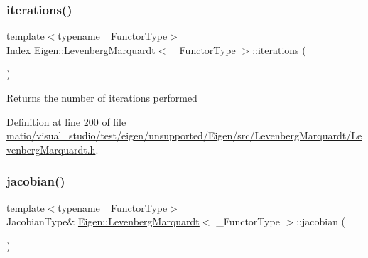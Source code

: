 \mbox{\label{class_eigen_1_1_levenberg_marquardt_aeb094683f0abe9c29ee89be0677de744}} 
\subsubsection{\texorpdfstring{iterations()}{iterations()}\hspace{0.1cm}{\footnotesize\ttfamily [2/2]}}
{\footnotesize\ttfamily template$<$typename \+\_\+\+Functor\+Type$>$ \\
Index \hyperlink{class_eigen_1_1_levenberg_marquardt}{Eigen\+::\+Levenberg\+Marquardt}$<$ \+\_\+\+Functor\+Type $>$\+::iterations (\begin{DoxyParamCaption}{ }\end{DoxyParamCaption})\hspace{0.3cm}{\ttfamily [inline]}}

\begin{DoxyReturn}{Returns}
the number of iterations performed 
\end{DoxyReturn}


Definition at line \hyperlink{matio_2visual__studio_2test_2eigen_2unsupported_2_eigen_2src_2_levenberg_marquardt_2_levenberg_marquardt_8h_source_l00200}{200} of file \hyperlink{matio_2visual__studio_2test_2eigen_2unsupported_2_eigen_2src_2_levenberg_marquardt_2_levenberg_marquardt_8h_source}{matio/visual\+\_\+studio/test/eigen/unsupported/\+Eigen/src/\+Levenberg\+Marquardt/\+Levenberg\+Marquardt.\+h}.

\mbox{\label{class_eigen_1_1_levenberg_marquardt_aaf2179310fdf873483f5d8b46f15da8c}} 
\subsubsection{\texorpdfstring{jacobian()}{jacobian()}\hspace{0.1cm}{\footnotesize\ttfamily [1/2]}}
{\footnotesize\ttfamily template$<$typename \+\_\+\+Functor\+Type$>$ \\
Jacobian\+Type\& \hyperlink{class_eigen_1_1_levenberg_marquardt}{Eigen\+::\+Levenberg\+Marquardt}$<$ \+\_\+\+Functor\+Type $>$\+::jacobian (\begin{DoxyParamCaption}{ }\end{DoxyParamCaption})\hspace{0.3cm}{\ttfamily [inline]}}

